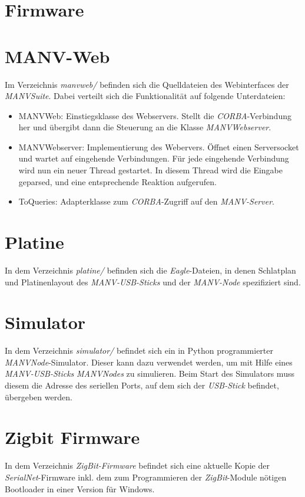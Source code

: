     \section{Firmware}


    \section{MANV-Web}

    Im Verzeichnis \emph{manvweb/} befinden sich die Quelldateien des Webinterfaces der
    \emph{MANVSuite}. Dabei verteilt sich die Funktionalität auf folgende Unterdateien:

    \begin{itemize}
        \item{MANVWeb:} Einstiegsklasse des Webservers. Stellt die \emph{CORBA}-Verbindung her
                        und übergibt dann die Steuerung an die Klasse \emph{MANVWebserver}.
        \item{MANVWebserver:} Implementierung des Webervers. Öffnet einen Serversocket und
                              wartet auf eingehende Verbindungen. Für jede eingehende Verbindung
                              wird nun ein neuer Thread gestartet. In diesem Thread
                              wird die Eingabe geparsed, und eine entsprechende Reaktion
                              aufgerufen. 
        \item{ToQueries:} Adapterklasse zum \emph{CORBA}-Zugriff auf den \emph{MANV-Server}. 
    \end{itemize}

    \section{Platine}

    In dem Verzeichnis \emph{platine/} befinden sich die \emph{Eagle}-Dateien, in 
    denen Schlatplan und Platinenlayout des \emph{MANV-USB-Sticks} und der
    \emph{MANV-Node} spezifiziert sind.

    \section{Simulator}

    In dem Verzeichnis \emph{simulator/} befindet sich ein in Python programmierter
    \emph{MANVNode}-Simulator. Dieser kann dazu verwendet werden, um mit Hilfe
    eines \emph{MANV-USB-Sticks} \emph{MANVNodes} zu simulieren. Beim Start des
    Simulators muss diesem die Adresse des seriellen Ports, auf dem sich der
    \emph{USB-Stick} befindet, übergeben werden.

    \section{Zigbit Firmware}
    In dem Verzeichnis \emph{ZigBit-Firmware} befindet sich eine aktuelle Kopie der
    \emph{SerialNet}-Firmware inkl. dem zum Programmieren der \emph{ZigBit}-Module
    nötigen Bootloader in einer Version für Windows.
